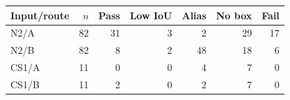 \begin{tabular}{lrrrrrr}
\toprule
Input/route & $n$ & Pass & Low IoU & Alias & No box & Fail \\
\midrule
N2/A & 82 & 31 & 3 & 2 & 29 & 17 \\
N2/B & 82 & 8 & 2 & 48 & 18 & 6 \\
CS1/A & 11 & 0 & 0 & 4 & 7 & 0 \\
CS1/B & 11 & 2 & 0 & 2 & 7 & 0 \\
\bottomrule
\end{tabular}
